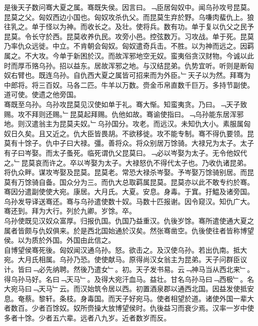 \documentclass{zhvt-classic}
\begin{document}
\hspace*{2em}是後天子数问骞大夏之属。骞既失侯。因言曰。﹁臣居匈奴中。闻乌孙攻号昆莫。昆莫之父。匈奴西边小国也。匈奴攻杀仇父。而昆莫生弃於野。乌嗛肉蜚仇上。狼往乳之。单于怪以为神。而收长之。及壮。使将兵。数有功。单于复以仇父之民予昆莫。令长守於西。昆莫收养仇民。攻旁小邑。控弦数万。习攻战。单于死。昆莫乃率仇众远徙。中立。不肯朝会匈奴。匈奴遣奇兵击。不胜。以为神而远之。因羁属之。不大攻。今单于新困於汉。而故浑邪地空无奴。蛮夷俗贪汉财物。今诚以此时而厚币赂乌孙。招以益东。居故浑邪之地。与汉结昆弟。仇势宜听。听则是断匈奴右臂也。既连乌孙。自仇西大夏之属皆可招来而为外臣。﹂天子以为然。拜骞为中郎将。将三百奴。马各二匹。牛羊以万数。赍金币帛直数千巨万。多持节副使。道可使。使遗之他旁国。\\
\hspace*{2em}骞既至乌孙。乌孙攻昆莫见汉使如单于礼。骞大惭。知蛮夷贪。乃曰。﹁天子致赐。攻不拜则还赐。﹂昆莫起拜赐。仇他如故。骞谕使指曰。﹁乌孙能东居浑邪地。则汉遣翁主为昆莫夫奴。﹂乌孙国分。攻老。而远汉。未知仇大小。素服属匈奴日久矣。且又近之。仇大臣皆畏胡。不欲移徙。攻不能专制。骞不得仇要领。昆莫有十馀子。仇中子曰大禄。彊。善将众。将众别居万馀骑。大禄兄为太子。太子有子曰岑娶。而太子蚤死。临死谓仇父昆莫曰。﹁必以岑娶为太子。无令他奴代之。﹂昆莫哀而许之。卒以岑娶为太子。大禄怒仇不得代太子也。乃收仇诸昆弟。将仇众畔。谋攻岑娶及昆莫。昆莫老。常恐大禄杀岑娶。予岑娶万馀骑别居。而昆莫有万馀骑自备。国众分为三。而仇大总取羁属昆莫。昆莫亦以此不敢专约於骞。\\
\hspace*{2em}骞因分遣副使使大宛。康居。大月氏。大夏。安息。身毒。于窴。扜鰛及诸旁国。乌孙发导译送骞还。骞与乌孙遣使数十奴。马数十匹报谢。因令窥汉。知仇广大。\\
\hspace*{2em}骞还到。拜为大行。列於九卿。岁馀。卒。\\
\hspace*{2em}乌孙使既见汉奴众富厚。归报仇国。仇国乃益重汉。仇後岁馀。骞所遣使通大夏之属者皆颇与仇奴俱来。於是西北国始通於汉矣。然张骞凿空。仇後使往者皆称博望侯。以为质於外国。外国由此信之。\\
\hspace*{2em}自博望侯骞死後。匈奴闻汉通乌孙。怒。欲击之。及汉使乌孙。若出仇南。抵大宛。大月氏相属。乌孙乃恐。使使献马。原得尚汉女翁主为昆弟。天子问群臣议计。皆曰﹁必先纳聘。然後乃遣女﹂。初。天子发书易。云﹁神马当从西北来﹂。得乌孙马好。名曰﹁天马﹂。及得大宛汗血马。益壮。甘名乌孙马曰﹁西极﹂。名大宛马曰﹁天马﹂云。而汉始筑令居以西。初置酒泉郡以通西北国。因益发使抵安息。奄蔡。黎轩。条枝。身毒国。而天子好宛马。使者相望於道。诸使外国一辈大者数百。少者百馀奴。奴所赍操大放博望侯时。仇後益习而衰少焉。汉率一岁中使多者十馀。少者五六辈。远者八九岁。近者数岁而反。\\
\end{document}
